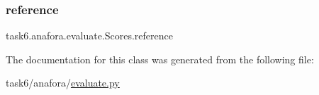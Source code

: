 \subsubsection{\texorpdfstring{reference}{reference}}
{\footnotesize\ttfamily task6.\+anafora.\+evaluate.\+Scores.\+reference}



The documentation for this class was generated from the following file\+:\begin{DoxyCompactItemize}
\item 
task6/anafora/\hyperlink{evaluate_8py}{evaluate.\+py}\end{DoxyCompactItemize}
